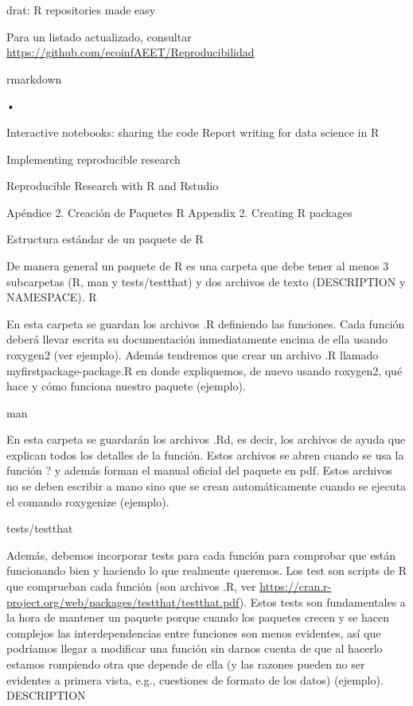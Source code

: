 \documentclass[]{tufte-handout}
\begin{document}
drat: R repositories made easy

Para un listado actualizado, consultar
\url{https://github.com/ecoinfAEET/Reproducibilidad}

rmarkdown

•

Interactive notebooks: sharing the code Report writing for data science
in R

Implementing reproducible research

Reproducible Research with R and Rstudio

Apéndice 2. Creación de Paquetes R Appendix 2. Creating R packages

Estructura estándar de un paquete de R

De manera general un paquete de R es una carpeta que debe tener al menos
3 subcarpetas (R, man y tests/testthat) y dos archivos de texto
(DESCRIPTION y NAMESPACE). R

En esta carpeta se guardan los archivos .R definiendo las funciones.
Cada función deberá llevar escrita su documentación inmediatamente
encima de ella usando roxygen2 (ver ejemplo). Además tendremos que crear
un archivo .R llamado myfirstpackage-package.R en donde expliquemos, de
nuevo usando roxygen2, qué hace y cómo funciona nuestro paquete
(ejemplo).

man

En esta carpeta se guardarán los archivos .Rd, es decir, los archivos de
ayuda que explican todos los detalles de la función. Estos archivos se
abren cuando se usa la función ? y además forman el manual oficial del
paquete en pdf. Estos archivos no se deben escribir a mano sino que se
crean automáticamente cuando se ejecuta el comando roxygenize (ejemplo).

tests/testthat

Además, debemos incorporar tests para cada función para comprobar que
están funcionando bien y haciendo lo que realmente queremos. Los test
son scripts de R que comprueban cada función (son archivos .R, ver
\url{https://cran.r-project.org/web/packages/testthat/testthat.pdf}).
Estos tests son fundamentales a la hora de mantener un paquete porque
cuando los paquetes crecen y se hacen complejos las interdependencias
entre funciones son menos evidentes, así que podríamos llegar a
modificar una función sin darnos cuenta de que al hacerlo estamos
rompiendo otra que depende de ella (y las razones pueden no ser
evidentes a primera vista, e.g., cuestiones de formato de los datos)
(ejemplo). DESCRIPTION
\end{document}
